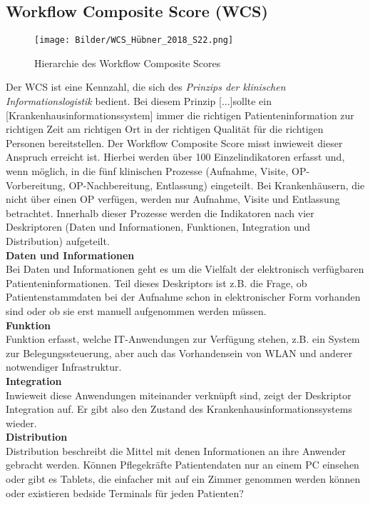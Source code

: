 \subsection{Workflow Composite Score (WCS)}
	\begin{figure}[ht]
		\centering
		\texttt{[image: Bilder/WCS\_Hübner\_2018\_S22.png]}
		\caption{Hierarchie des Workflow Composite Scores \parencite[22]{huebner2018}}
		\label{fig:WCS}
	\end{figure}
	Der WCS ist eine Kennzahl, die sich des \textit{Prinzips der klinischen Informationslogistik} bedient. Bei diesem Prinzip \glqq{}[...]sollte ein [Krankenhausinformationssystem] immer die richtigen Patienteninformation zur richtigen Zeit am richtigen Ort in der richtigen Qualität für die richtigen Personen bereitstellen.\grqq\parencite[36]{huebner2019} Der Workflow Composite Score misst inwieweit dieser Anspruch erreicht ist. Hierbei werden über 100 Einzelindikatoren erfasst und, wenn möglich, in die fünf klinischen Prozesse (Aufnahme, Visite, OP-Vorbereitung, OP-Nachbereitung, Entlassung) eingeteilt. Bei Krankenhäusern, die nicht über einen OP verfügen, werden nur Aufnahme, Visite und Entlassung betrachtet. Innerhalb dieser Prozesse werden die Indikatoren nach vier Deskriptoren (Daten und Informationen, Funktionen, Integration und Distribution) aufgeteilt. \parencite{huebner2019}
	\vspace{\parheadvspace}\\
	\textbf{Daten und Informationen}\\
	Bei Daten und Informationen geht es um die Vielfalt der elektronisch verfügbaren Patienteninformationen. Teil dieses Deskriptors ist z.B. die Frage, ob Patientenstammdaten bei der Aufnahme schon in elektronischer Form vorhanden sind oder ob sie erst manuell aufgenommen werden müssen. 
	\vspace{\parheadvspace}\\
	\textbf{Funktion}\\
	Funktion erfasst, welche IT-Anwendungen zur Verfügung stehen, z.B. ein System zur Belegungssteuerung, aber auch das Vorhandensein von WLAN und anderer notwendiger Infrastruktur.
	\vspace{\parheadvspace}\\
	\textbf{Integration}\\
	Inwieweit diese Anwendungen miteinander verknüpft sind, zeigt der Deskriptor Integration auf. Er gibt also den Zustand des Krankenhausinformationssystems wieder.
	\vspace{\parheadvspace}\\
	\textbf{Distribution}\\
	Distribution beschreibt die Mittel mit denen Informationen an ihre Anwender gebracht werden. Können Pflegekräfte Patientendaten nur an einem PC einsehen oder gibt es Tablets, die einfacher mit auf ein Zimmer genommen werden können oder existieren bedside Terminals für jeden Patienten?\\

